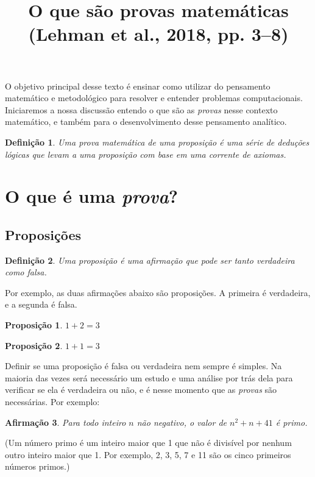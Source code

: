 \documentclass[12pt]{article}
\title{O que são provas matemáticas \\ \large (Lehman et al., 2018, pp. 3--8)}
\author{}
\date{}
\newtheorem{proposicao}{Proposição}[subsection]
\newtheorem{afirmacao}[proposicao]{Afirmação}
\newtheorem*{definicao}{Definição}
\begin{document}
\maketitle

O objetivo principal desse texto é ensinar como utilizar do pensamento
matemático e metodológico para resolver e entender problemas computacionais.
Iniciaremos a nossa discussão entendo o que são as \emph{provas} nesse contexto
matemático, e também para o desenvolvimento desse pensamento analítico.

\begin{definicao}
	Uma \emph{prova matemática} de uma \emph{proposição} é uma série de
	\emph{deduções lógicas} que levam a uma proposição com base em uma corrente
	de \emph{axiomas}.
\end{definicao}

\section{O que é uma \emph{prova}?}

\subsection{Proposições}

\begin{definicao}
	Uma proposição é uma afirmação que pode ser tanto verdadeira como falsa.
\end{definicao}

Por exemplo, as duas afirmações abaixo são proposições. A primeira é
verdadeira, e a segunda é falsa.

\begin{proposicao}
	$1 + 2 = 3$
\end{proposicao}

\begin{proposicao}
	$1 + 1 = 3$
\end{proposicao}

Definir se uma proposição é falsa ou verdadeira nem sempre é simples. Na
maioria das vezes será necessário um estudo e uma análise por trás dela para
verificar se ela é verdadeira ou não, e é nesse momento que as \emph{provas}
são necessárias. Por exemplo:

\begin{afirmacao}
	Para todo inteiro $n$ não negativo, o valor de $n^{2} + n + 41$ é primo.
\end{afirmacao}

(Um número primo é um inteiro maior que 1 que não é divisível por nenhum outro
inteiro maior que 1. Por exemplo, 2, 3, 5, 7 e 11 são os cinco primeiros
números primos.)
\end{document}
